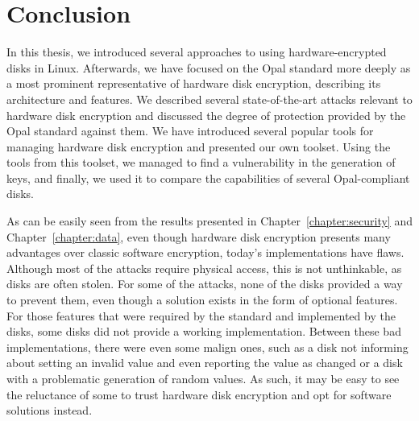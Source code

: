 

















\chapter{Conclusion}

In this thesis, we introduced several approaches to using hardware-encrypted disks in Linux. Afterwards, we have focused on the Opal standard more deeply as a most prominent representative of hardware disk encryption, describing its architecture and features.
We described several state-of-the-art attacks relevant to hardware disk encryption and discussed the degree of protection provided by the Opal standard against them.
We have introduced several popular tools for managing hardware disk encryption and presented our own toolset. 
Using the tools from this toolset, we managed to find a vulnerability in the generation of keys, and finally, we used it to compare the capabilities of several Opal-compliant disks. 


As can be easily seen from the results presented in Chapter~\ref{chapter:security} and Chapter~\ref{chapter:data},
even though hardware disk encryption presents many advantages over classic software encryption, today's implementations have flaws. Although most of the attacks require physical access, this is not unthinkable, as disks are often stolen.
For some of the attacks, none of the disks provided a way to prevent them, even though a solution exists in the form of optional features. For those features that were required by the standard and implemented by the disks, some disks did not provide a working implementation. Between these bad implementations, there were even some malign ones, such as a disk not informing about setting an invalid value and even reporting the value as changed or a disk with a problematic generation of random values.
As such, it may be easy to see the reluctance of some to trust hardware disk encryption and opt for software solutions instead.

